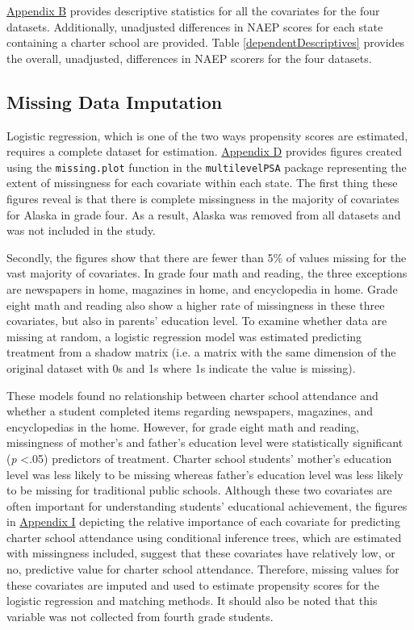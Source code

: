 \documentclass[letterpaper,12p,twoside]{article} %
\begin{document}


\hyperref[appendixB]{Appendix B} provides descriptive statistics for all the covariates for the four datasets. Additionally, unadjusted differences in NAEP scores for each state containing a charter school are provided. Table \ref{dependentDescriptives} provides the overall, unadjusted, differences in NAEP scorers for the four datasets.



\subsection{Missing Data Imputation}

Logistic regression, which is one of the two ways propensity scores are estimated, requires a complete dataset for estimation. \hyperref[appendixD]{Appendix D} provides figures created using the \texttt{missing.plot} function in the \texttt{multilevelPSA} package representing the extent of missingness for each covariate within each state. The first thing these figures reveal is that there is complete missingness in the majority of covariates for Alaska in grade four. As a result, Alaska was removed from all datasets and was not included in the study. 

Secondly, the figures show that there are fewer than 5\% of values missing for the vast majority of covariates. In grade four math and reading, the three exceptions are newspapers in home, magazines in home, and encyclopedia in home. Grade eight math and reading also show a higher rate of missingness in these three covariates, but also in parents' education level. To examine whether data are missing at random, a logistic regression model was estimated predicting treatment from a shadow matrix (i.e. a matrix with the same dimension of the original dataset with 0s and 1s where 1s indicate the value is missing). 

These models found no relationship between charter school attendance and whether a student completed items regarding newspapers, magazines, and encyclopedias in the home. However, for grade eight math and reading, missingness of mother's and father's education level were statistically significant (\textit{p} \textless .05) predictors of treatment. Charter school students' mother's education level was less likely to be missing whereas father's education level was less likely to be missing for traditional public schools. Although these two covariates are often important for understanding students' educational achievement, the figures in \hyperref[appendixI]{Appendix I} depicting the relative importance of each covariate for predicting charter school attendance using conditional inference trees, which are estimated with missingness included, suggest that these covariates have relatively low, or no, predictive value for charter school attendance. Therefore, missing values for these covariates are imputed and used to estimate propensity scores for the logistic regression and matching methods. It should also be noted that this variable was not collected from fourth grade students.
\end{document}
